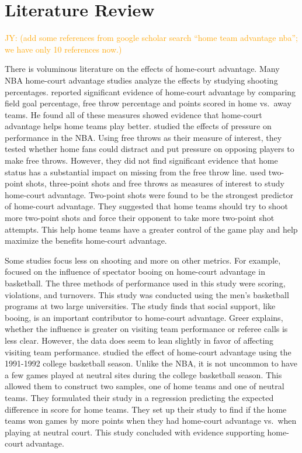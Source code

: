 \documentclass[10pt]{article}
\newcommand{\jy}[1]{\textcolor{orange}{JY: (#1)}}
\begin{document}
\section{Literature Review}

\jy{add some references from google scholar search ``home team
  advantage nba''; we have only 10 references now.}

There is voluminous literature on the effects of home-court advantage.
Many NBA home-court advantage studies analyze the effects by studying shooting
percentages. \citet{Kotecki} reported significant evidence of home-court
advantage by comparing field goal
percentage, free throw percentage and points scored in home vs.~away teams.
He found all of these measures showed evidence that
home-court advantage helps home teams play better. \citet{Cao} studied the effects
of pressure on performance in the NBA. Using free throws as their measure of interest, 
they tested whether home
fans could distract and put pressure on opposing players to make free
throws. However, they did not find significant evidence
that home status has a substantial impact on missing from the free throw line. 
\citet{Harris} used two-point shots, three-point shots and free
throws as measures of interest to study home-court advantage. Two-point
shots were found to be the strongest predictor of home-court advantage. They
suggested that home teams should try to shoot more two-point shots and force
their opponent to take more two-point shot attempts. This help home teams have a
greater control of the game play and help maximize the benefits 
home-court advantage.

Some studies focus less on shooting and more on other metrics.
For example, \citet{Greer} focused on the influence of spectator booing on
home-court advantage in basketball. The three methods of performance used
in this study were scoring, violations, and turnovers. This study was conducted
using the men's basketball programs at two large universities. The study finds that
social support, like booing, is an important contributor to home-court advantage.
Greer explains, whether the influence is greater on visiting team performance or
referee calls is less clear. However, the data does seem to lean slightly in
favor of affecting visiting team performance. \citet{Harville} studied the
effect of home-court advantage using the 1991-1992 college basketball season.
Unlike the NBA, it is not uncommon to have a few games played at neutral sites
during the college basketball season. This allowed them to construct two samples,
one of home teams and one of neutral teams. They formulated their study in a
regression predicting the expected difference in score for home teams.
They set up their study to find if the home teams won games by more points when
they had home-court advantage vs.~when playing at neutral court. This study
concluded with evidence supporting home-court advantage.
\end{document}
